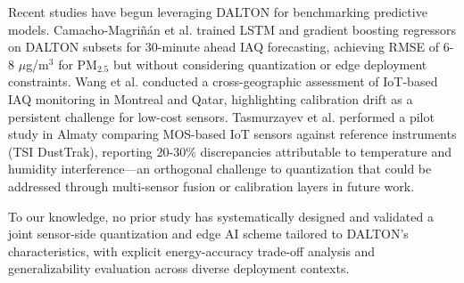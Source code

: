 Recent studies have begun leveraging DALTON for benchmarking predictive models. Camacho-Magri\~n\'an et al. \cite{camacho2025leveraging} trained LSTM and gradient boosting regressors on DALTON subsets for 30-minute ahead IAQ forecasting, achieving RMSE of 6-8 $\mu$g/m$^3$ for PM$_{2.5}$ but without considering quantization or edge deployment constraints. Wang et al. \cite{wang2025indoor} conducted a cross-geographic assessment of IoT-based IAQ monitoring in Montreal and Qatar, highlighting calibration drift as a persistent challenge for low-cost sensors. Tasmurzayev et al. \cite{tasmurzayev2025lowcost} performed a pilot study in Almaty comparing MOS-based IoT sensors against reference instruments (TSI DustTrak), reporting 20-30\% discrepancies attributable to temperature and humidity interference—an orthogonal challenge to quantization that could be addressed through multi-sensor fusion or calibration layers in future work.

To our knowledge, no prior study has systematically designed and validated a joint sensor-side quantization and edge AI scheme tailored to DALTON's characteristics, with explicit energy-accuracy trade-off analysis and generalizability evaluation across diverse deployment contexts.